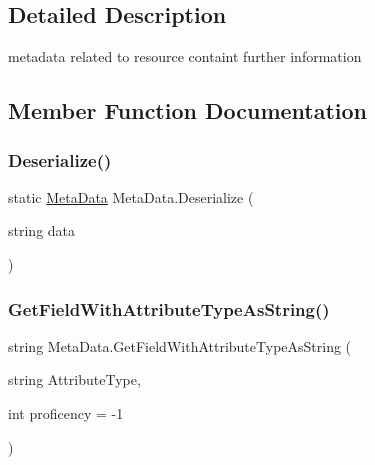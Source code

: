 \subsection{Detailed Description}
metadata related to resource containt further information 



\subsection{Member Function Documentation}
\mbox{\label{class_meta_data_adcfb4cc074566933e35c3f14451960ed}} 
\subsubsection{\texorpdfstring{Deserialize()}{Deserialize()}}
{\footnotesize\ttfamily static \mbox{\hyperlink{class_meta_data}{Meta\+Data}} Meta\+Data.\+Deserialize (\begin{DoxyParamCaption}\item[{string}]{data }\end{DoxyParamCaption})\hspace{0.3cm}{\ttfamily [static]}}

\mbox{\label{class_meta_data_a6060e6297723e54b0df6c20defb57297}} 
\subsubsection{\texorpdfstring{Get\+Field\+With\+Attribute\+Type\+As\+String()}{GetFieldWithAttributeTypeAsString()}}
{\footnotesize\ttfamily string Meta\+Data.\+Get\+Field\+With\+Attribute\+Type\+As\+String (\begin{DoxyParamCaption}\item[{string}]{Attribute\+Type,  }\item[{int}]{proficency = {\ttfamily -\/1} }\end{DoxyParamCaption})}

\mbox{\label{class_meta_data_ad61836ec0caf65061ecdcd16c0ee6109}} 
